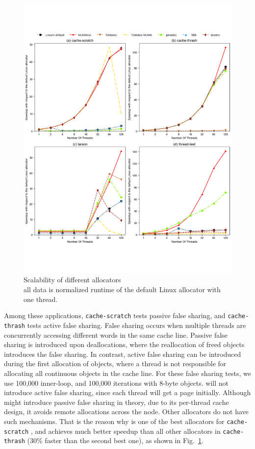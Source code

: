\begin{figure}[!ht]
    \centering
    \includegraphics[width=\textwidth]{figure/sythentic-scalobility.pdf}
    \caption{Scalability of different allocators\\  all data is normalized runtime of the default Linux allocator with one thread.}
    \label{sythentic-scalability}
\end{figure}

Among these applications, \texttt{cache-scratch} tests passive false sharing, and \texttt{cache-thrash} tests active false sharing. False sharing occurs when multiple threads are concurrently accessing different words in the same cache line. 
Passive false sharing is introduced upon deallocations, where the reallocation of freed objects introduces the false sharing. In contrast, active false sharing can be introduced during the first allocation of objects, where a thread is not responsible for allocating all continuous objects in the cache line. For these false sharing tests, we use 100,000 inner-loop, and 100,000 iterations with 8-byte objects. \NM{} will not introduce active false sharing, since each thread will get a page initially. 
 Although \NM{} might introduce passive false sharing in theory, due to its per-thread cache design, it avoids remote allocations across the node. Other allocators do not have such mechanisms. That is the reason why \NM{} is one of the best allocators for
 \texttt{cache-scratch} , and achieves much better speedup than all other allocators in \texttt{cache-thrash} (30\% faster than the second best one), as shown in Fig.~\ref{sythentic-scalability}.  

